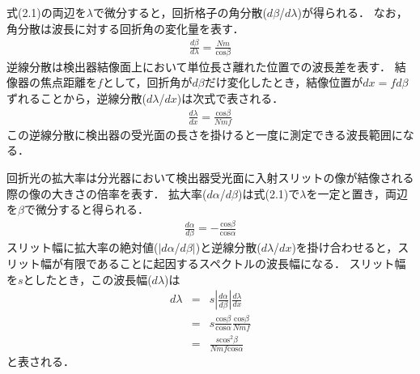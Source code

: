 式(2.1)の両辺を$\lambda$で微分すると，回折格子の角分散($d\beta$/$d\lambda$)が得られる．
なお，角分散は波長に対する回折角の変化量を表す．
\begin{eqnarray}
    \frac{d\beta}{d\lambda} = \frac{Nm}{\mathrm{cos}{\beta}}
\end{eqnarray}
逆線分散は検出器結像面上において単位長さ離れた位置での波長差を表す．
結像器の焦点距離を$f$として，回折角が$d\beta$だけ変化したとき，結像位置が$dx=fd\beta$ずれることから，逆線分散($d\lambda$/$dx$)は次式で表される．
\begin{eqnarray}
    \frac{d\lambda}{dx} = \frac{\mathrm{cos}{\beta}}{Nmf}
\end{eqnarray}
この逆線分散に検出器の受光面の長さを掛けると一度に測定できる波長範囲になる．

回折光の拡大率は分光器において検出器受光面に入射スリットの像が結像される際の像の大きさの倍率を表す．
拡大率($d\alpha$/$d\beta$)は式(2.1)で$\lambda$を一定と置き，両辺を$\beta$で微分すると得られる．
\begin{eqnarray}
    \frac{d\alpha}{d\beta} = -\frac{\mathrm{cos}{\beta}}{\mathrm{cos}{\alpha}}
\end{eqnarray}
スリット幅に拡大率の絶対値($|d\alpha$/$d\beta|$)と逆線分散($d\lambda$/$dx$)を掛け合わせると，スリット幅が有限であることに起因するスペクトルの波長幅になる．
スリット幅を$s$としたとき，この波長幅($d\lambda$)は
\begin{eqnarray}
     d\lambda &=& s\left|\frac{d\alpha}{d\beta}\right|\frac{d\lambda}{dx} \nonumber \\%
        &=&s\frac{\mathrm{cos}{\beta}}{\mathrm{cos}{\alpha}}\frac{\mathrm{cos}{\beta}}{Nmf} \nonumber \\
        &=&\frac{s\mathrm{cos}^2{\beta}}{Nmf\mathrm{cos}{\alpha}}
\end{eqnarray}
と表される．

